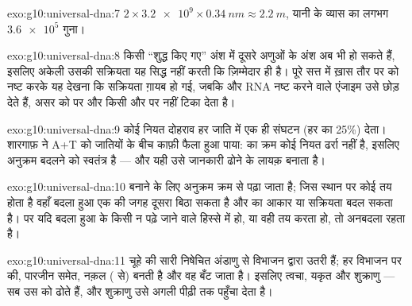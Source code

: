 \begin{solution}{exo:g10:universal-dna:7}
$2 \times \num{3.2e9} \times \qty{0.34}{nm} \approx \qty{2.2}{m}$, यानी
 के व्यास का लगभग $\num{3.6e5}$ गुना।
\end{solution}

\begin{solution}{exo:g10:universal-dna:8}
किसी ``शुद्ध किए गए'' अंश में दूसरे अणुओं के अंश अब भी हो सकते हैं,
इसलिए अकेली उसकी सक्रियता यह सिद्ध नहीं करती कि ज़िम्मेदार  ही है।
पूरे सत्त में ख़ास तौर पर  को नष्ट करके यह देखना कि सक्रियता ग़ायब हो
गई, जबकि  और RNA नष्ट करने वाले एंजाइम उसे छोड़ देते हैं, असर को
 पर और किसी और पर नहीं टिका देता है।
\end{solution}

\begin{solution}{exo:g10:universal-dna:9}
कोई नियत दोहराव हर जाति में एक ही संघटन (हर  का 25\%) देता।
शारगाफ़ ने A+T को जातियों के बीच काफ़ी फैला हुआ पाया:  का क्रम
कोई नियत ढर्रा नहीं है, इसलिए अनुक्रम बदलने को स्वतंत्र है --- और यही
उसे जानकारी ढोने के लायक़ बनाता है।
\end{solution}

\begin{solution}{exo:g10:universal-dna:10}
 बनाने के लिए अनुक्रम क्रम से पढ़ा जाता है; जिस स्थान पर कोई
 तय होता है वहाँ बदला हुआ  एक  की जगह दूसरा
बिठा सकता है और  का आकार या सक्रियता बदल सकता है। पर यदि बदला हुआ
  के किसी न पढ़े जाने वाले हिस्से में हो, या वही  तय
करता हो, तो  अनबदला रहता है।
\end{solution}

\begin{solution}{exo:g10:universal-dna:11}
चूहे की सारी  निषेचित अंडाणु से विभाजन द्वारा उतरी हैं; हर
विभाजन पर  की, पारजीन समेत, नक़ल ( से) बनती है और वह बँट जाता
है। इसलिए त्वचा, यकृत और शुक्राणु --- सब उस  को ढोते हैं, और शुक्राणु
उसे अगली पीढ़ी तक पहुँचा देता है।
\end{solution}


